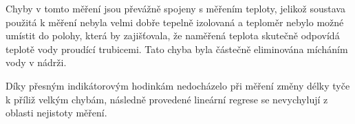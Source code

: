 \documentclass[protokol.tex]{subfiles}
\begin{document}
Chyby v tomto měření jsou převážně spojeny s měřením teploty, jelikož soustava použitá k měření nebyla velmi dobře tepelně izolovaná a teploměr nebylo možné umístit do polohy, která by zajišťovala, že naměřená teplota skutečně odpovídá teplotě vody proudící trubicemi. Tato chyba byla částečně eliminována mícháním vody v nádrži. 

Díky přesným indikátorovým hodinkám nedocházelo při měření změny délky tyče k příliž velkým chybám, následně provedené lineární regrese se nevychylují z oblasti nejistoty měření. 
\end{document}
